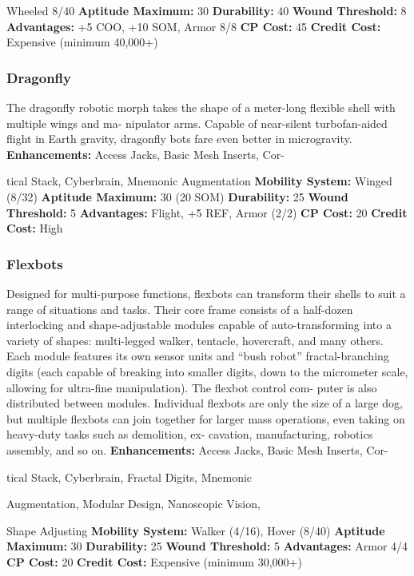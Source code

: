 Wheeled 8/40
\textbf{Aptitude Maximum: }30
\textbf{Durability: }40
\textbf{Wound Threshold: }8
\textbf{Advantages:} +5 COO, +10 SOM, Armor 8/8
\textbf{CP Cost: }45
\textbf{Credit Cost: }Expensive (minimum 40,000+)

\subsubsection{Dragonfly}

The dragonfly robotic morph takes the shape of a 
meter-long flexible shell with multiple wings and ma-
nipulator arms. Capable of near-silent turbofan-aided 
flight in Earth gravity, dragonfly bots fare even better 
in microgravity.
\textbf{Enhancements:} Access Jacks, Basic Mesh Inserts, Cor-

tical Stack, Cyberbrain, Mnemonic Augmentation
\textbf{Mobility System:} Winged (8/32)
\textbf{Aptitude Maximum: }30 (20 SOM)
\textbf{Durability: }25
\textbf{Wound Threshold:} 5
\textbf{Advantages:} Flight, +5 REF, Armor (2/2)
\textbf{CP Cost: }20
\textbf{Credit Cost: }High

\subsubsection{Flexbots}

Designed for multi-purpose functions, flexbots  can 
transform their shells to suit a range of situations 
and tasks. Their core frame consists of a half-dozen 
interlocking and shape-adjustable modules capable of 
auto-transforming into a variety of shapes: multi-legged 
walker, tentacle, hovercraft, and many others. Each 
module features its own sensor units and ``bush robot'' 
fractal-branching digits (each capable of breaking into 
smaller digits, down to the micrometer scale, allowing 
for ultra-fine manipulation). The flexbot control com-
puter is also distributed between modules. Individual 
flexbots are only the size of a large dog, but multiple 
flexbots can join together for larger mass operations, 
even taking on heavy-duty tasks such as demolition, ex-
cavation, manufacturing, robotics assembly, and so on.
\textbf{Enhancements:} Access Jacks, Basic Mesh Inserts, Cor-

tical Stack, Cyberbrain, Fractal Digits, Mnemonic 

Augmentation, Modular Design, Nanoscopic Vision, 

Shape Adjusting
\textbf{Mobility System:} Walker (4/16), Hover (8/40)
\textbf{Aptitude Maximum: }30
\textbf{Durability:} 25
\textbf{Wound Threshold:} 5
\textbf{Advantages:} Armor 4/4
\textbf{CP Cost:} 20
\textbf{Credit Cost: }Expensive (minimum 30,000+)

